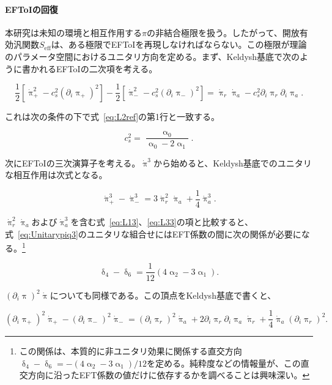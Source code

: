 \documentclass[a4paper,11pt]{ltjsarticle}
\numberwithin{equation}{section}
\def\uppia{\uppi_{a}}
\def\uppir{\uppi_{r}}
\newcommand{\Eq}[1]{Eq.~(\ref{#1})}
\newcommand{\Eqs}[1]{Eqs.~(\ref{#1})}
\renewcommand{\Eq}[1]{式~\eqref{#1}}
\renewcommand{\Eqs}[1]{式~\eqref{#1}}
\begin{document}
\paragraph{EFToIの回復} 本研究は未知の環境と相互作用する$\pi$の非結合極限を扱う。したがって、開放有効汎関数$S_{\mathrm{eff}}$は、ある極限でEFToI\cite{Cheung:2007st}を再現しなければならない。この極限が理論のパラメータ空間におけるユニタリ方向を定める。まず、Keldysh基底で次のように書かれるEFToIの二次項を考える。

\begin{equation}
\frac{1}{2}\left[\dot{\uppi}_{+}^{2}-c_{s}^{2}(\partial_{i}\uppi_{+})^{2}\right]-\frac{1}{2}\left[\dot{\uppi}_{-}^{2}-c_{s}^{2}(\partial_{i}\uppi_{-})^{2}\right]=\dot{\uppi}_r\dot{\uppi}_a-c_{s}^{2}\partial_{i}{\uppir}\partial_{i}{\uppia}.
\end{equation}

これは次の条件の下で\Eq{eq:L2ref}の第1行と一致する。

\begin{equation}
c_{s}^{2} = \frac{\upalpha_0}{\upalpha_{0}-2\upalpha_1}.
\end{equation}

次にEFToIの三次演算子を考える。$\dot{\uppi}^3$から始めると、Keldysh基底でのユニタリな相互作用は次式となる。

\begin{equation}\label{eq:Unitarypiq3}
\dot{\uppi}^{3}_{+}-\dot{\uppi}^{3}_{-}=3\dot{\uppi}_{r}^{2}\dot{\uppi}_{a} + \frac{1}{4}\dot{\uppi}^{3}_{a}.
\end{equation}

$\dot{\uppi}_r^2\dot{\uppi}_a$および$\dot{\uppi}_a^3$を含む\Eqs{eq:L13}、\eqref{eq:L33}の項と比較すると、\Eq{eq:Unitarypiq3}のユニタリな組合せにはEFT係数の間に次の関係が必要になる。\footnote{この関係は、本質的に非ユニタリ効果に関係する直交方向$\updelta_4-\updelta_6=-(4\upalpha_2-3\upalpha_1)/12$を定める。純粋度などの情報量が、この直交方向に沿ったEFT係数の値だけに依存するかを調べることは興味深い。}

\begin{equation}\label{eq:combin1}
\updelta_4-\updelta_6= \frac{1}{12}\left(4 \upalpha_2 -3\upalpha_1 \right).
\end{equation}

$(\partial_i\uppi)^2\dot{\uppi}$についても同様である。この頂点をKeldysh基底で書くと、

\begin{equation}
(\partial_{i}\uppi_{+})^{2}\dot{\uppi}_{+}-(\partial_{i}\uppi_{-})^{2}\dot{\uppi}_{-}=(\partial_{i}\uppir)^{2}\dot{\uppi}_{a} + 2 \partial_{i}\uppir\partial_{i}\uppia\dot{\uppi}_r+\frac{1}{4}\dot{\uppi}_a(\partial_{i}\uppir)^{2}.
\end{equation}
\end{document}
